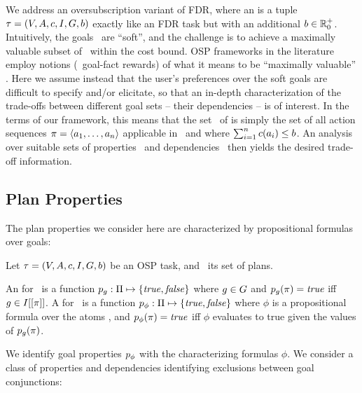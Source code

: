We address an oversubscription variant of FDR, where an
 is a tuple $\tau =
(V,\allowbreak A,\allowbreak{\ensuremath{c}},\allowbreak I,\allowbreak G,\allowbreak{\ensuremath{b}})$
exactly like an FDR task but with an additional 
${b} \in {\mathbb{R}}^+_0$. Intuitively, the goals \goal\ are
``soft'', and the challenge is to achieve a maximally valuable subset
of \goal\ within the cost bound. OSP frameworks in the literature
employ notions (\eg\ goal-fact rewards) of what it means to be
``maximally valuable''
\cite{smith:icaps-04,domshlak:mirkis:jair-15}. Here we assume instead
that the user's preferences over the soft goals are difficult to
specify and/or elicitate, so that an in-depth characterization of the
trade-offs between different goal sets -- their dependencies -- is of
interest. In the terms of our framework, this means that the set
\plans\ of  is simply the set of all action sequences
$\pi = \langle a_1, \dots, a_n\rangle$ applicable in \init\ and
where $\sum_{i=1}^n {c}(a_i) \leq {\ensuremath{b}}$. An analysis over
suitable sets of properties \props\ and dependencies \deps\ then
yields the desired trade-off information.






\subsection{Plan Properties}
\label{goaldep:properties}

The plan properties we consider here are characterized by
propositional formulas over goals:

\begin{definition}
Let $\tau =
(V,\allowbreak A,\allowbreak{\ensuremath{c}},\allowbreak I,\allowbreak G,\allowbreak{\ensuremath{b}})$
be an OSP task, and \plans\ its set of plans. 

An  for \task\ is a function $p_g :
\Pi \mapsto \{\mathit{true}, \mathit{false}\}$ where $g \in G$ and
$p_g(\pi) = \mathit{true}$ iff $g \in I[[\pi]]$.
%
A  for \task\ is a function
$p_\phi : \Pi \mapsto \{\mathit{true}, \mathit{false}\}$ where $\phi$ is a
propositional formula over the atoms \goal, and $p_\phi(\pi) =
\mathit{true}$ iff $\phi$ evaluates to true given the values of
$p_g(\pi)$.
\end{definition}

We identify goal properties $p_\phi$ with the characterizing
formulas $\phi$. We consider a class of properties and dependencies
identifying exclusions between goal conjunctions:

